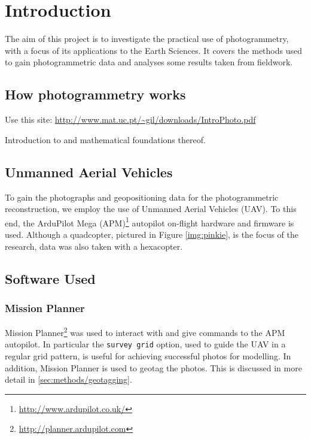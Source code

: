 \section{Introduction}

The aim of this project is to investigate the practical use of photogrammetry,
with a focus of its applications to the Earth Sciences. It covers the methods
used to gain photogrammetric data and analyses some results taken from
fieldwork.

\subsection{How photogrammetry works}

Use this site: \url{http://www.mat.uc.pt/~gil/downloads/IntroPhoto.pdf}

Introduction to and mathematical foundations thereof.

\subsection{Unmanned Aerial Vehicles}

To gain the photographs and geopositioning data for the photogrammetric
reconstruction, we employ the use of Unmanned Aerial Vehicles (UAV). To this
end, the ArduPilot Mega (APM)\footnote{\url{http://www.ardupilot.co.uk/}}
autopilot on-flight hardware and firmware is used.  Although a quadcopter,
pictured in Figure \ref{img:pinkie}, is the focus of the research, data was also
taken with a hexacopter.


\subsection{Software Used}

\subsubsection{Mission Planner}

Mission Planner\footnote{\url{http://planner.ardupilot.com}} was used to
interact with and give commands to the APM autopilot. In particular the
\texttt{survey grid} option, used to guide the UAV in a regular grid pattern, is
useful for achieving successful photos for modelling. In addition, Mission
Planner is used to geotag the photos. This is discussed in more detail in
\ref{sec:methods/geotagging}.

